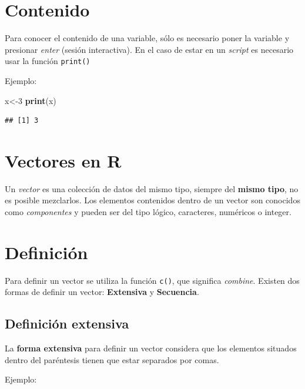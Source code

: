 \documentclass[
]{book}
\newenvironment{Shaded}{\begin{snugshade}}{\end{snugshade}}
\newcommand{\DecValTok}[1]{\textcolor[rgb]{0.00,0.00,0.81}{#1}}
\newcommand{\FunctionTok}[1]{\textcolor[rgb]{0.13,0.29,0.53}{\textbf{#1}}}
\newcommand{\NormalTok}[1]{#1}
\newcommand{\OtherTok}[1]{\textcolor[rgb]{0.56,0.35,0.01}{#1}}
\begin{document}
\section{Contenido}\label{contenido}

Para conocer el contenido de una variable, sólo es necesario poner la variable y presionar \emph{enter} (sesión interactiva). En el caso de estar en un \emph{script} es necesario usar la función \texttt{print()}

Ejemplo:

\begin{Shaded}
\begin{Highlighting}[]
\NormalTok{x}\OtherTok{\textless{}{-}}\DecValTok{3}
\FunctionTok{print}\NormalTok{(x)}
\end{Highlighting}
\end{Shaded}

\begin{verbatim}
## [1] 3
\end{verbatim}

\section{Vectores en R}\label{vectors}

Un \emph{vector} es una colección de datos del mismo tipo, siempre del \textbf{mismo tipo}, no es posible mezclarlos. Los elementos contenidos dentro de un vector son conocidos como \emph{componentes} y pueden ser del tipo lógico, caracteres, numéricos o integer.

\section{Definición}\label{definiciuxf3n}

Para definir un vector se utiliza la función \texttt{c()}, que significa \emph{combine}.
Existen dos formas de definir un vector: \textbf{Extensiva} y \textbf{Secuencia}.

\subsection{Definición extensiva}\label{definiciuxf3n-extensiva}

La \textbf{forma extensiva} para definir un vector considera que los elementos situados dentro del paréntesis tienen que estar separados por comas.

Ejemplo:
\end{document}

